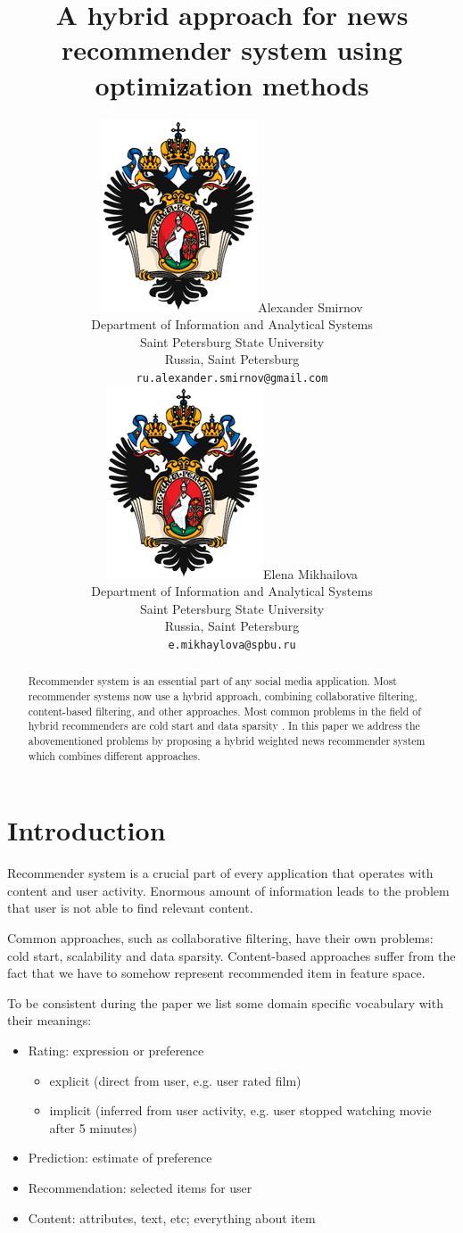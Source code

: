 \documentclass{article}
\title{A hybrid approach for news recommender system using optimization methods}
\author{
    {\includegraphics[scale=0.07]{./images/spbu.png}\hspace{1mm}Alexander Smirnov}\\
	Department of Information and Analytical Systems\\
	Saint Petersburg State University\\
	Russia, Saint Petersburg\\
	\texttt{ru.alexander.smirnov@gmail.com} \\
	\And
	{\includegraphics[scale=0.07]{images/spbu.png}\hspace{1mm}Elena Mikhailova} \\
	Department of Information and Analytical Systems\\
	Saint Petersburg State University\\
	Russia, Saint Petersburg\\
	\texttt{e.mikhaylova@spbu.ru} \\
}
\begin{document}
\maketitle

\begin{abstract}


    Recommender system is an essential part of any social media application. Most recommender systems now use a hybrid approach, combining collaborative filtering, content-based filtering, and other approaches. Most common problems in the field of hybrid recommenders are cold start and data sparsity \citep{overview}. In this paper we address the abovementioned problems by proposing a hybrid weighted news recommender system which combines different approaches.

\end{abstract}





\section{Introduction}

    Recommender system is a crucial part of every application that operates with content and user activity. Enormous amount of information leads to the problem that user is not able to find relevant content.

    Common approaches, such as collaborative filtering, have their own problems: cold start, scalability and data sparsity. Content-based approaches suffer from the fact that we have to somehow represent recommended item in feature space.
    
    To be consistent during the paper we list some domain specific vocabulary with their meanings:

        \begin{itemize}
            \item Rating: expression or preference

                \begin{itemize}
                    \item explicit (direct from user, e.g. user rated film)
                    \item implicit (inferred from user activity, e.g. user stopped watching movie after 5 minutes)
                \end{itemize}
            \item Prediction: estimate of preference
            \item Recommendation: selected items for user
            \item Content: attributes, text, etc; everything about item
        \end{itemize}
\end{document}
